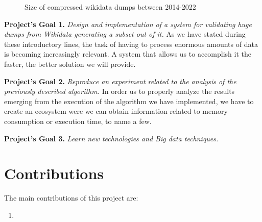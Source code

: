 \begin{figure}[h]
    \centering
    \caption{Size of compressed wikidata dumps between 2014-2022~\cite{web:wikidata:dumps}}
    \label{fig:dumps}
\end{figure}

\textbf{Project's Goal 1.} \textit{Design and implementation of a system for validating huge dumps from Wikidata generating a subset out of it.} As we have stated during these introductory lines, the task of having to process enormous amounts of data is becoming increasingly relevant. A system that allows us to accomplish it the faster, the better solution we will provide.

\textbf{Project's Goal 2.} \textit{Reproduce an experiment related to the analysis of the previously described algorithm.} In order us to properly analyze the results emerging from the execution of the algorithm we have implemented, we have to create an ecosystem were we can obtain information related to memory consumption or execution time, to name a few.

\textbf{Project's Goal 3.} \textit{Learn new technologies and Big data techniques.}

\section{Contributions}

The main contributions of this project are:

\begin{enumerate}
    \item
\end{enumerate}

